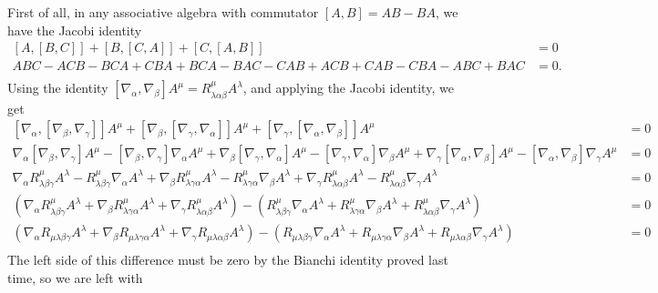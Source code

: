 \documentclass{../../templates/lkx_pset}
\begin{document}
\begin{solution}
	First of all, in any associative algebra with commutator $[A, B] = AB-BA$, we have the Jacobi identity
	\[
		\begin{aligned}
			[A, [B,C]] + [B,[C,A]] + [C, [A,B]]
			 & =0  \\
			ABC-ACB - BCA+CBA + BCA-BAC
			-CAB+ACB + CAB - CBA - ABC+BAC
			 & =0. \\
		\end{aligned}
	\]
	Using the identity $[\nabla_{\alpha}, \nabla_\beta] A^\mu = R^\mu_{\lambda\alpha\beta} A^\lambda$, and applying the Jacobi identity, we get
	\[
		\begin{aligned}
			[\nabla_\alpha, [\nabla_\beta, \nabla_\gamma]]A^\mu +
			[\nabla_\beta, [\nabla_\gamma, \nabla_\alpha]]A^\mu +
			[\nabla_\gamma, [\nabla_\alpha, \nabla_\beta]]A^\mu
			  & = 0 \\
			\nabla_\alpha [\nabla_\beta, \nabla_\gamma] A^{\mu} - [\nabla_\beta, \nabla_\gamma]\nabla_\alpha A^{\mu}
			+\nabla_\beta[\nabla_\gamma, \nabla_\alpha] A^{\mu} - [\nabla_\gamma, \nabla_\alpha]\nabla_\beta A^{\mu}
			+\nabla_\gamma[\nabla_\alpha, \nabla_\beta] A^{\mu} - [\nabla_\alpha, \nabla_\beta]\nabla_\gamma A^{\mu}
			  & =0  \\
			\nabla_\alpha R^{\mu}_{\lambda\beta\gamma}A^\lambda
			-R^{\mu}_{\lambda\beta\gamma} \nabla_\alpha A^\lambda
			+\nabla_\beta R^{\mu}_{\lambda\gamma\alpha}A^\lambda
			-R^{\mu}_{\lambda\gamma\alpha} \nabla_\beta A^\lambda
			+\nabla_\gamma R^{\mu}_{\lambda\alpha\beta}A^\lambda
			-R^{\mu}_{\lambda\alpha\beta} \nabla_\gamma A^\lambda
			  & =0  \\
			(
			\nabla_\alpha R^{\mu}_{\lambda\beta\gamma}A^\lambda
			+\nabla_\beta R^{\mu}_{\lambda\gamma\alpha}A^\lambda
			+\nabla_\gamma R^{\mu}_{\lambda\alpha\beta}A^\lambda
			) -
			(
			R^{\mu}_{\lambda\beta\gamma} \nabla_\alpha A^\lambda
			+R^{\mu}_{\lambda\gamma\alpha} \nabla_\beta A^\lambda
			+R^{\mu}_{\lambda\alpha\beta} \nabla_\gamma A^\lambda
			) & =0  \\
			(
			\nabla_\alpha R_{\mu\lambda\beta\gamma}A^\lambda
			+\nabla_\beta R_{\mu\lambda\gamma\alpha}A^\lambda
			+\nabla_\gamma R_{\mu\lambda\alpha\beta}A^\lambda
			) -
			(
			R_{\mu\lambda\beta\gamma} \nabla_\alpha A^\lambda
			+R_{\mu\lambda\gamma\alpha} \nabla_\beta A^\lambda
			+R_{\mu\lambda\alpha\beta} \nabla_\gamma A^\lambda
			) & =0  \\
		\end{aligned}
	\]
	The left side of this difference must be zero by the Bianchi identity proved last time, so we are left with

\end{solution}
\end{document}
